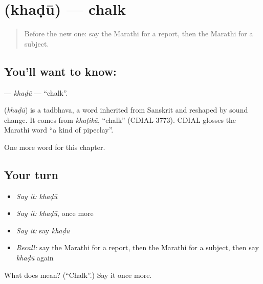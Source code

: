 \section[\texorpdfstring{\mr{खडू} (khaḍū)}{खडू (khaḍū)}]{ (khaḍū) — chalk}

\label{lesson:MR-C221-khadu}



\begin{quote}
Before the new one: say the Marathi for a report, then the Marathi for a subject.
\end{quote}

\subsection*{You'll want to know: }
\textbf{} — \emph{khaḍū} — \textquotedblleft{}chalk\textquotedblright{}.

\begin{cousinweb}
\textbf{} (\emph{khaḍū}) is a tadbhava, a word inherited from Sanskrit and reshaped by sound change. It comes from \emph{khaṭikā}, \textquotedblleft{}chalk\textquotedblright{} (CDIAL 3773). CDIAL glosses the Marathi word \textquotedblleft{}a kind of pipeclay\textquotedblright{}.
\end{cousinweb}

\begin{grammarlens}[title={What you've built}]
One more word for this chapter.
\end{grammarlens}

\subsection*{Your turn}
\begin{itemize}
\raggedright
  \item \emph{Say it:} \emph{khaḍū}
  \item \emph{Say it:} \emph{khaḍū}, once more
  \item \emph{Say it:} say \emph{khaḍū}
  \item \emph{Recall:} say the Marathi for a report, then the Marathi for a subject, then say \emph{khaḍū} again
\end{itemize}

\begin{tcolorbox}[breakable,colback=teal!4,colframe=teal!35!black,title={Before you move on}]
What does  mean? (\textquotedblleft{}Chalk\textquotedblright{}.) Say it once more.
\end{tcolorbox}
